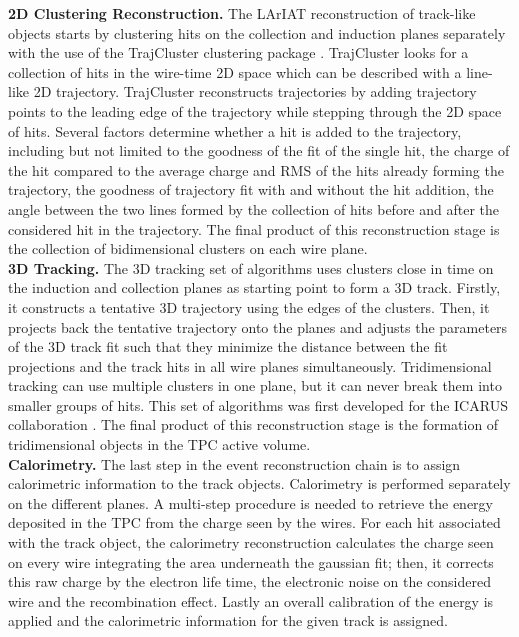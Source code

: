 \documentclass[aps,prl,twocolumn,showpacs,superscriptaddress,groupedaddress]{revtex4}  %
\begin{document}
\textbf{2D Clustering Reconstruction.} 
The LArIAT reconstruction of track-like objects starts by clustering hits on the collection and induction planes separately with the use of the TrajCluster clustering package \cite{Baller2016}. 
TrajCluster looks for a collection of hits in the wire-time 2D space which can be described with a line-like 2D trajectory. TrajCluster reconstructs trajectories by adding trajectory points to the leading edge of the trajectory while stepping through the 2D space of hits. Several factors determine whether a hit is added to the trajectory, including but not limited to the goodness of the fit of the single hit, the charge of the hit compared to the average charge and RMS of the hits already forming the trajectory, the goodness of trajectory fit with and without the hit addition, the angle between the two lines formed by the collection of hits before and after the considered hit in the trajectory.
The final product of this reconstruction stage is the collection of bidimensional clusters on each wire plane.\\%

\textbf{3D Tracking.} The 3D tracking set of algorithms uses clusters close in time on the induction and collection planes as starting point to form a 3D track. Firstly, it constructs a tentative 3D trajectory using the edges of the clusters. Then, it  projects back the tentative trajectory onto the planes and adjusts the parameters of the 3D track fit such that they minimize the distance between the fit projections and the track hits in all wire planes simultaneously.  Tridimensional tracking can use multiple clusters in one plane, but it can never break them into smaller groups of hits. This set of algorithms was first developed for the ICARUS collaboration \cite{Antonello2013}. The final product of this reconstruction stage is the formation of  tridimensional objects in the TPC active volume.\\%

\textbf{Calorimetry.} The last step in the event reconstruction chain is to assign calorimetric information to the track objects. Calorimetry is performed separately on the different planes. A multi-step procedure is needed to retrieve the energy deposited in the TPC  from the charge seen by the wires.
For each hit associated with the track object, the calorimetry reconstruction calculates the charge seen on every wire integrating the area underneath the gaussian fit; then, it corrects this raw charge by the electron life time, the electronic noise on the considered wire and the recombination effect. Lastly an overall calibration of the energy is applied and the calorimetric information for the given track is assigned. \\
\end{document}
